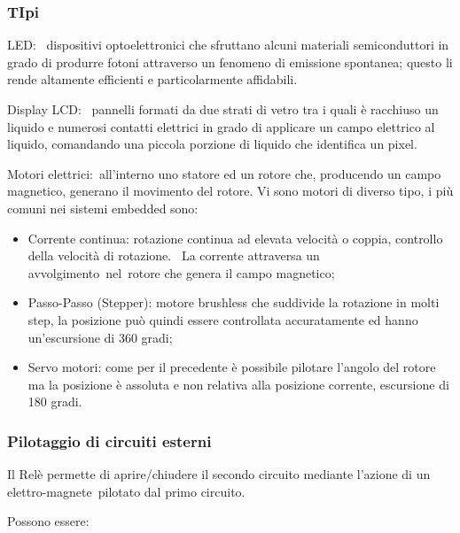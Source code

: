\documentclass[
]{article}
\providecommand{\tightlist}{%
  \setlength{\itemsep}{0pt}\setlength{\parskip}{0pt}}
\begin{document}
\subsubsection{\texorpdfstring{{TIpi}}{TIpi}}\label{h.eceqh6vx1wyv}

{LED}{: ~dispositivi optoelettronici che sfruttano alcuni materiali
semiconduttori in grado di produrre fotoni attraverso un fenomeno di
emissione spontanea; questo li rende altamente efficienti e
particolarmente affidabili.}

{}

{Display LCD}{: ~pannelli formati da due strati di vetro tra i quali è
racchiuso un liquido e numerosi contatti elettrici in grado di applicare
un campo elettrico al liquido, comandando una piccola porzione di
liquido che identifica un pixel.}

{}

{Motori elettrici:}{~all'interno uno statore ed un rotore che,
producendo un campo magnetico, generano il movimento del rotore. Vi sono
motori di diverso tipo, i più comuni nei sistemi embedded sono: }

\begin{itemize}
\tightlist
\item
  {Corrente continua}{: rotazione continua ad elevata velocità o coppia,
  controllo della velocità di rotazione. ~La corrente attraversa }{un
  avvolgimento}{~}{nel}{~rotore che genera il campo magnetico;}
\item
  {Passo-Passo (Stepper)}{: motore brushless che suddivide la rotazione
  in molti step, la posizione può quindi essere controllata
  accuratamente ed hanno un'escursione di 360 gradi;}
\item
  {Servo motori}{: come per il precedente è possibile pilotare l'angolo
  del rotore ma la posizione è assoluta e non relativa alla posizione
  corrente, escursione di 180 gradi.}
\end{itemize}

{}

\subsubsection{\texorpdfstring{{Pilotaggio di circuiti
esterni}}{Pilotaggio di circuiti esterni}}\label{h.br8d4e9bpojs}

{Il Relè permette di aprire/chiudere il secondo circuito mediante
l'azione di un }{elettro-magnete}{~pilotato dal primo circuito.}{~}

{Possono essere:}
\end{document}

